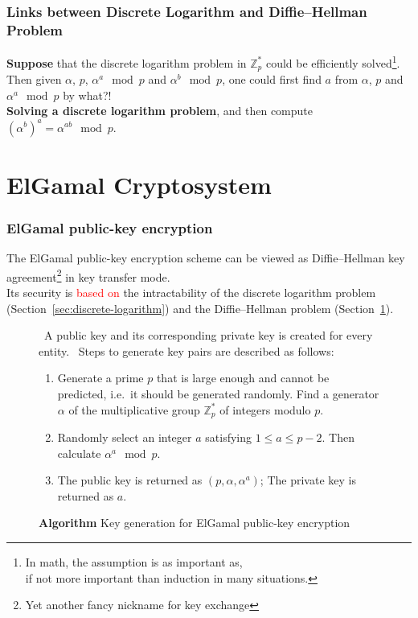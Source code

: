 \documentclass[hyperref=true]{beamer}
\begin{document}
\begin{frame}
  \frametitle{Links between Discrete Logarithm and Diffie–Hellman
    Problem}
\textbf{Suppose} that the discrete logarithm problem in
$\mathbb{Z}_{p}^{*}$ could be efficiently solved\footnote{In math,
  the assumption is as important as,\\ if not more important than
  induction in many situations.}. Then given $\alpha$, $p$,
$\alpha^{a}\mod p$ and $\alpha^{b}\mod p$, one could first find $a$
from $\alpha$, $p$ and $\alpha^{a}\mod p$ by
what?!\\[8pt]\textbf{Solving a discrete logarithm problem}, and  then
compute ${(\alpha^{b})}^{a}=\alpha^{ab}\mod p$.

\end{frame}

\section{ElGamal Cryptosystem}
\label{sec:elgamal-cryptosystem}



\begin{frame}
  \frametitle{ElGamal public-key encryption}
The ElGamal public-key encryption scheme can be viewed as
Diffie--Hellman key agreement\footnote{Yet another fancy nickname for
  key exchange} in key transfer mode.\\
Its security is \textcolor{red}{based on} the intractability of the
discrete logarithm problem (Section~\ref{sec:discrete-logarithm}) and
the Diffie–Hellman problem (Section~\ref{sec:elgamal-cryptosystem}).
\end{frame}


\begin{frame}
  \begin{figure}
    \centering
  \begin{algorithmic}
    \ENSURE~A public key and its corresponding private key is created
    for every entity.
    \STATE~Steps to generate key pairs are described as follows:
    \begin{enumerate}
    \item Generate a prime $p$ that is large enough and cannot be
      predicted, i.e.\ it should be generated randomly. Find a
      generator $\alpha$ of the multiplicative group $\mathbb{Z}_{p}^{*}$ of
      integers modulo $p$.
    \item Randomly select an integer $a$ satisfying $1\leq
      a\leq p-2$. Then calculate $\alpha^{a}\mod p$.
    \item The public key is returned as $(p,\alpha,\alpha^{a})$; The
      private key is returned as $a$.
    \end{enumerate}
  \end{algorithmic}
  \caption{\textbf{Algorithm} Key generation for ElGamal public-key encryption}
  \label{fig:basic-elgamal-encryption}
  \end{figure}
\end{frame}
\end{document}
